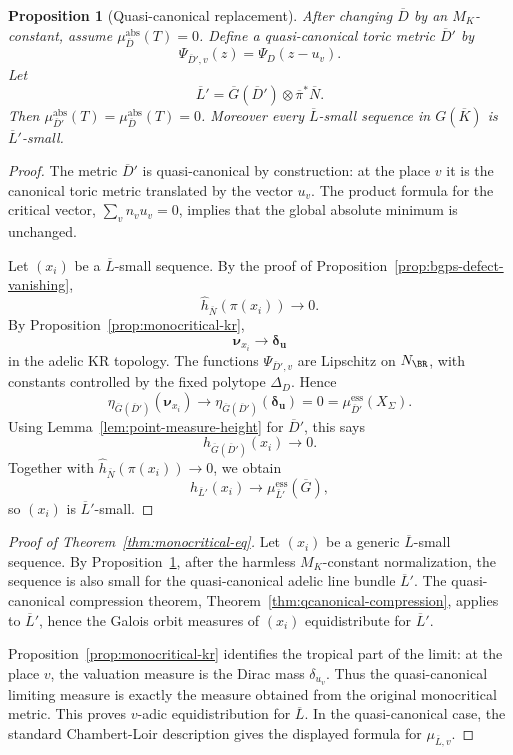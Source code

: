 \documentclass[10pt,a4paper]{amsart}
\theoremstyle{plain}
\newtheorem{proposition}[theorem]{Proposition}
\theoremstyle{plain}
\numberwithin{equation}{section}
\providecommand{\bD}{\overline{D}}
\providecommand{\bL}{\overline{L}}
\providecommand{\bN}{\overline{N}}
\providecommand{\muess}{\mu^{\mathrm{ess}}}
\providecommand{\muabs}{\mu^{\mathrm{abs}}}
\begin{document}
\begin{proposition}[Quasi-canonical replacement]
	\label{prop:monocritical-qcanonical-replacement}
	After changing \(\bD\) by an \(M_K\)-constant, assume
	\(\muabs_{\bD}(T)=0\).  Define a quasi-canonical toric metric \(\bD'\) by
	\[
	\Psi_{\bD',v}(z)=\Psi_D(z-u_v).
	\]
	Let
	\[
	\bL'=\overline G(\bD')\otimes\overline\pi^*\bN.
	\]
	Then \(\muabs_{\bD'}(T)=\muabs_{\bD}(T)=0\).  Moreover every \(\bL\)-small
	sequence in \(G(\overline K)\) is \(\bL'\)-small.
\end{proposition}

\begin{proof}
	The metric \(\bD'\) is quasi-canonical by construction: at the place \(v\) it
	is the canonical toric metric translated by the vector \(u_v\).  The product
	formula for the critical vector, \(\sum_vn_vu_v=0\), implies that the global
	absolute minimum is unchanged.
	
	Let \((x_i)\) be a \(\bL\)-small sequence.  By the proof of
	Proposition~\ref{prop:bgps-defect-vanishing},
	\[
	\hat h_{\bN}(\pi(x_i))\to0.
	\]
	By Proposition~\ref{prop:monocritical-kr},
	\[
	\boldsymbol\nu_{x_i}\to\boldsymbol\delta_{\mathbf u}
	\]
	in the adelic KR topology.  The functions \(\Psi_{\bD',v}\) are Lipschitz on
	\(N_\BR\), with constants controlled by the fixed polytope \(\Delta_D\).  Hence
	\[
	\eta_{\overline G(\bD')}(\boldsymbol\nu_{x_i})
	\to
	\eta_{\overline G(\bD')}(\boldsymbol\delta_{\mathbf u})
	=0
	=\muess_{\bD'}(X_\Sigma).
	\]
	Using Lemma~\ref{lem:point-measure-height} for \(\bD'\), this says
	\[
	h_{\overline G(\bD')}(x_i)\to0.
	\]
	Together with \(\hat h_{\bN}(\pi(x_i))\to0\), we obtain
	\[
	h_{\bL'}(x_i)\to\muess_{\bL'}(\overline G),
	\]
	so \((x_i)\) is \(\bL'\)-small.
\end{proof}

\begin{proof}[Proof of Theorem~\ref{thm:monocritical-eq}]
	Let \((x_i)\) be a generic \(\bL\)-small sequence.  By
	Proposition~\ref{prop:monocritical-qcanonical-replacement}, after the harmless
	\(M_K\)-constant normalization, the sequence is also small for the
	quasi-canonical adelic line bundle \(\bL'\).  The quasi-canonical compression
	theorem, Theorem~\ref{thm:qcanonical-compression}, applies to \(\bL'\), hence
	the Galois orbit measures of \((x_i)\) equidistribute for \(\bL'\).
	
	Proposition~\ref{prop:monocritical-kr} identifies the tropical part of the
	limit: at the place \(v\), the valuation measure is the Dirac mass
	\(\delta_{u_v}\).  Thus the quasi-canonical limiting measure is exactly the
	measure obtained from the original monocritical metric.  This proves
	\(v\)-adic equidistribution for \(\bL\).  In the quasi-canonical case, the
	standard Chambert-Loir description gives the displayed formula for
	\(\mu_{\bL,v}\).
\end{proof}
\end{document}
